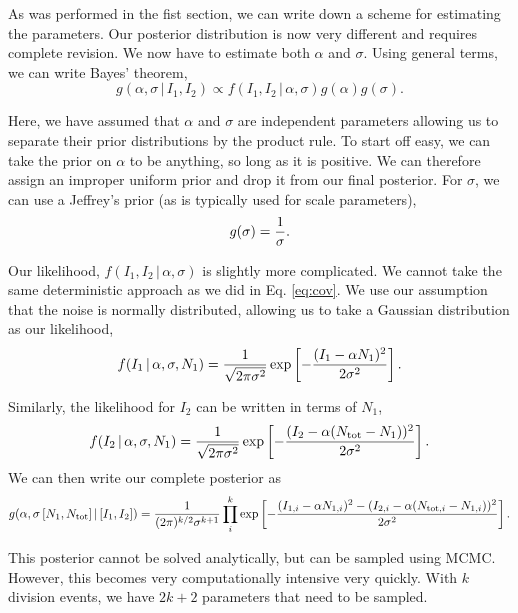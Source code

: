 As was performed in the fist section, we can write down a scheme for estimating
the parameters. Our posterior distribution is now very different and requires
complete revision. We now have to estimate both $\alpha$ and $\sigma$. Using
general terms, we can write Bayes' theorem,
\begin{equation}
  g(\alpha, \sigma\, \vert\, I_1, I_2) \propto f(I_1, I_2\,\vert\, \alpha, \sigma)g(\alpha)g(\sigma).
  \label{model1_bayes}
\end{equation}

Here, we have assumed that $\alpha$ and $\sigma$ are independent parameters
allowing us to separate their prior distributions by the product rule. To start
off easy, we can take the prior on $\alpha$ to be anything, so long as it is positive.
We can therefore assign an improper uniform prior and drop it from our final
posterior. For $\sigma$, we can use a Jeffrey's prior (as is typically used
for scale parameters),
\begin{equation}
  g(\sigma) = {1 \over \sigma}.
\end{equation}

Our likelihood, $f(I_1, I_2\, \vert\, \alpha, \sigma)$ is slightly more complicated.
We cannot take the same deterministic approach as we did in Eq. \ref{eq:cov}.
We use our assumption that the noise is normally distributed, allowing us
to take a Gaussian distribution as our likelihood,
\begin{equation}
  f(I_1\,\vert \, \alpha, \sigma, N_1)= {1 \over \sqrt{2\pi\sigma^2}}\exp\left[-{(I_1 - \alpha N_1)^2 \over 2\sigma^2}\right].
  \label{eq:model1_like_i1}
\end{equation}

Similarly, the likelihood for $I_2$ can be written in terms of $N_1$,
\begin{equation}
  f(I_2\,\vert\, \alpha, \sigma, N_1) = {1 \over \sqrt{2\pi\sigma^2}}\exp\left[-{(I_2 - \alpha (N_\text{tot} - N_1))^2 \over 2\sigma^2}\right].
\end{equation}
We can then write our complete posterior as
\begin{equation}
  g(\alpha, \sigma\, [N_1, N_\text{tot}]\, \vert\, [I_1, I_2]) = {1\over
  (2\pi)^{k/2}\sigma^{k+1}}
  \prod\limits_i^k\exp\left[-{(I_{1,i} - \alpha
  N_{1,i})^2 - (I_{2,i} - \alpha(N_{\text{tot},i} - N_{1,i}))^2 \over
  2\sigma^2}\right].
  \label{eq:model1_post}
\end{equation}

This posterior cannot be solved analytically, but can be sampled using MCMC. However, this becomes
very computationally intensive very quickly. With $k$ division events, we have $2k + 2$ parameters
that need to be sampled.


